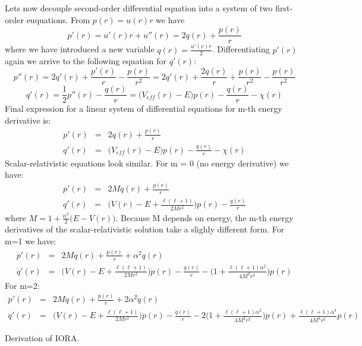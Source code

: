 Let\textquotesingle{}s now decouple second-\/order differential equation into a system of two first-\/order euquations. From $ p(r) = u(r)r $ we have \[ p'(r) = u'(r)r + u''(r) = 2q(r) + \frac{p(r)}{r} \] where we have introduced a new variable $ q(r) = \frac{u'(r) r}{2} $. Differentiating $ p'(r) $ again we arrive to the following equation for $ q'(r) $\+: \[ p''(r) = 2q'(r) + \frac{p'(r)}{r} - \frac{p(r)}{r^2} = 2q'(r) + \frac{2q(r)}{r} + \frac{p(r)}{r^2} - \frac{p(r)}{r^2} \] \[ q'(r) = \frac{1}{2}p''(r) - \frac{q(r)}{r} = \big(V_{eff}(r) - E\big) p(r) - \frac{q(r)}{r} - \chi(r) \] Final expression for a linear system of differential equations for m-\/th energy derivative is\+: \begin{eqnarray*} p'(r) &=& 2q(r) + \frac{p(r)}{r} \\ q'(r) &=& \big(V_{eff}(r) - E\big) p(r) - \frac{q(r)}{r} - \chi(r) \end{eqnarray*} Scalar-\/relativistic equations look similar. For m = 0 (no energy derivative) we have\+: \begin{eqnarray*} p'(r) &=& 2Mq(r) + \frac{p(r)}{r} \\ q'(r) &=& \big(V(r) - E + \frac{\ell(\ell+1)}{2Mr^2}\big) p(r) - \frac{q(r)}{r} \end{eqnarray*} where $ M = 1 + \frac{\alpha^2}{2}\big(E-V(r)\big) $. Because M depends on energy, the m-\/th energy derivatives of the scalar-\/relativistic solution take a slighly different form. For m=1 we have\+: \begin{eqnarray*} \dot{p}'(r) &=& 2M\dot{q}(r) + \frac{\dot{p}(r)}{r} + \alpha^2 q(r) \\ \dot{q}'(r) &=& \big(V(r) - E + \frac{\ell(\ell+1)}{2Mr^2}\big) \dot{p}(r) - \frac{\dot{q}(r)}{r} - \big(1 + \frac{\ell(\ell+1)\alpha^2}{4M^2r^2}\big)p(r) \end{eqnarray*} For m=2\+: \begin{eqnarray*} \ddot{p}'(r) &=& 2M\ddot{q}(r) + \frac{\ddot{p}(r)}{r} + 2 \alpha^2 \dot{q}(r) \\ \ddot{q}'(r) &=& \big(V(r) - E + \frac{\ell(\ell+1)}{2Mr^2}\big) \ddot{p}(r) - \frac{\ddot{q}(r)}{r} - 2 \big(1 + \frac{\ell(\ell+1)\alpha^2}{4M^2r^2}\big)\dot{p}(r) + \frac{\ell(\ell+1)\alpha^4}{4M^3r^2} p(r) \end{eqnarray*}

Derivation of I\+O\+R\+A.

